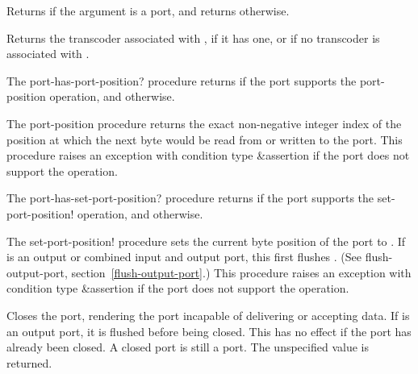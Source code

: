 \begin{entry}{%
}
   
Returns \schtrue{} if the argument is a port, and returns \schfalse{}
otherwise.
\end{entry}

\begin{entry}{%
}

Returns the transcoder associated with , if it has one,
or \schfalse{} if no transcoder is associated with .
\end{entry}

\begin{entry}{%
}

The {\cf port-has-port-position?} procedure returns \schtrue{} if the
port supports the {\cf port-position} operation, and \schfalse{}
otherwise.

The {\cf port-position} procedure
returns the exact non-negative integer index of the position at which the
next byte would be read from or written to the port.
This procedure raises an exception with condition type {\cf\&assertion}
if the port does not support the operation.
\end{entry}   

\begin{entry}{%
}

   
The {\cf port-has-set-port-position?} procedure returns \schtrue{} if the port
supports the {\cf set-port-position!} operation, and \schfalse{}
otherwise.
   
The {\cf set-port-position!} procedure sets the current byte position
of the port to .  If  is an output or combined
input and output port, this first flushes .  (See {\cf
  flush-output-port}, section~\ref{flush-output-port}.)
This procedure raises an exception with condition type {\cf\&assertion}
if the port does not support the operation.
\end{entry}

\begin{entry}{%
}
   
Closes the port, rendering the port incapable of delivering or
accepting data. If  is an output port, it is flushed before
being closed.  This has no effect if the port has already been closed.
A closed port is still a port. The unspecified value is returned.
\end{entry}

